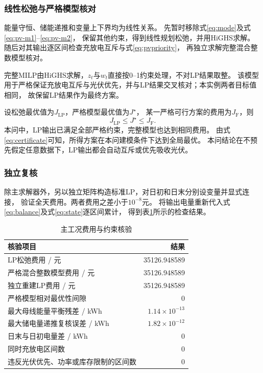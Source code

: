 \documentclass[UTF8,a4paper,12pt]{ctexart}
\newcommand{\Cost}{35126.948589}
\begin{document}
\subsubsection{线性松弛与严格模型核对}
能量守恒、储能递推和变量上下界均为线性关系。
先暂时移除式\eqref{eq:mode}及式\eqref{eq:pv-m1}--\eqref{eq:pv-m2}，
保留其他约束，得到线性规划松弛，并用HiGHS求解。
随后对其输出逐区间检查充放电互斥与式\eqref{eq:pvpriority}，
再独立求解完整混合整数模型核对。

完整MILP由HiGHS求解，$z_t$与$w_t$直接按0--1约束处理，不对LP结果取整。
该模型用于严格保证充放电互斥与光伏优先，并与LP结果交叉核对；本实例两者目标值相同，
故保留LP结果作为最终方案。

设松弛最优值为$J_{\mathrm{LP}}$，严格模型最优值为$J^\star$，
某一严格可行方案的费用为$J_{\mathrm F}$，则
\begin{equation}
  J_{\mathrm{LP}}\le J^\star\le J_{\mathrm F}.
  \label{eq:certificate}
\end{equation}
本问中，LP输出已满足全部严格约束，完整模型也达到相同费用。
由式\eqref{eq:certificate}可知，所得方案在本问建模条件下达到全局最优。
本问结论在不预先假定任意数据下，LP输出都会自动互斥或优先吸收光伏。

\subsubsection{独立复核}
除主求解器外，另以独立矩阵构造标准LP，对日初和日末分别设变量并显式连接，
验证全天费用。两者费用之差小于$10^{-8}$元。
将输出电量重新代入式\eqref{eq:balance}及式\eqref{eq:state}逐区间累计，
得到表\ref{tab:validation}所示的检查结果。

\begin{table}[H]
  \centering\small
  \caption{主工况费用与约束核验}\label{tab:validation}
  \begin{tabularx}{0.90\linewidth}{Xr}
    \toprule
    核验项目 & 结果\\
    \midrule
    LP松弛费用 / 元 & \Cost\\
    严格混合整数模型费用 / 元 & \Cost\\
    独立重建LP费用 / 元 & \Cost\\
    严格模型相对最优性间隙 & 0\\
    最大母线能量平衡残差 / kWh & $1.14\times10^{-13}$\\
    最大储电量递推复核误差 / kWh & $1.82\times10^{-12}$\\
    日末与日初电量差 / kWh & 0\\
    同时充放电区间数 & 0\\
    违反光伏优先、功率或库存限制的区间数 & 0\\
    \bottomrule
  \end{tabularx}
\end{table}
\end{document}
